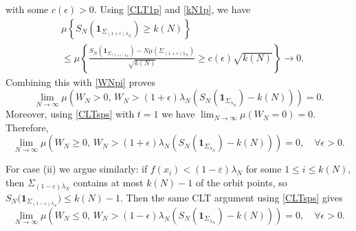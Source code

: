 \documentclass[11pt,twoside,a4paper,reqno]{amsart}
\def\one{{\mathbf{1}}}
\begin{document}
with some $c(\epsilon)>0$. Using \eqref{CLT1p} and \eqref{kN1p}, we have
\begin{align*}
&\mu\left\{S_N\left(\one_{\Sigma_{(1+\epsilon)\lambda_N}}\right)\ge k(N)\right\}\\
&\le\mu\left\{
\frac{S_N\left(\one_{\Sigma_{(1+\epsilon)\lambda_N}}\right)-N\mu(\Sigma_{(1+\epsilon)\lambda_N})}{\sqrt{k(N)}}
\ge c(\epsilon)\sqrt{k(N)}\right\}\to0.
\end{align*}
Combining this with \eqref{WNpi} proves
\begin{equation}\label{Wnposboundl}
\lim_{N\rightarrow\infty} \mu\left(W_N>0,\, W_N>(1+\epsilon)\lambda_N \left(S_N(\one_{\Sigma_{\lambda_N}})-k(N)\right) \right) = 0.
\end{equation}
Moreover, using \eqref{CLTsps} with $t=1$ we have $\lim_{N\rightarrow\infty} \mu(W_N=0)=0.$
Therefore,
\begin{equation}\label{Wnposbound}
\lim_{N\rightarrow\infty} \mu\left(W_N\ge0,\, W_N>(1+\epsilon)\lambda_N \left(S_N(\one_{\Sigma_{\lambda_N}})-k(N)\right) \right)= 0,\quad \forall \epsilon>0.
\end{equation}

For case (ii) we argue similarly: if $f(x_i) < (1-\varepsilon)\lambda_N$ for some $1\leq i\leq k(N)$, then $\Sigma_{(1-\varepsilon)\lambda_N}$ contains at most $k(N)-1$ of the orbit points, so $S_N\bigl(\one_{\Sigma_{(1-\varepsilon)\lambda_N}}\bigr) \le k(N)-1.$ Then the same CLT argument using \eqref{CLTsps} gives
\begin{equation}\label{Wnnegbound}
\lim_{N\rightarrow\infty} \mu\left(W_N\le 0,\, W_N > (1-\epsilon)\lambda_N \left(S_N(\one_{\Sigma_{\lambda_N}})-k(N)\right) \right)=0,\quad \forall \epsilon>0.
\end{equation}
\end{document}
